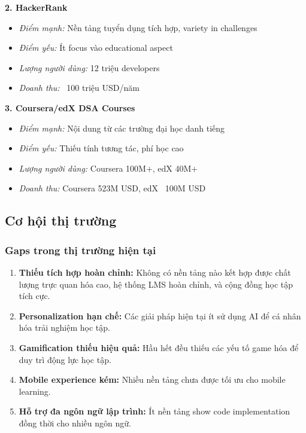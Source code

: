 \textbf{2. HackerRank}
\begin{itemize}
\item \textit{Điểm mạnh:} Nền tảng tuyển dụng tích hợp, variety in challenges
\item \textit{Điểm yếu:} Ít focus vào educational aspect
\item \textit{Lượng người dùng:} 12 triệu developers
\item \textit{Doanh thu:} ~100 triệu USD/năm
\end{itemize}

\textbf{3. Coursera/edX DSA Courses}
\begin{itemize}
\item \textit{Điểm mạnh:} Nội dung từ các trường đại học danh tiếng
\item \textit{Điểm yếu:} Thiếu tính tương tác, phí học cao
\item \textit{Lượng người dùng:} Coursera 100M+, edX 40M+
\item \textit{Doanh thu:} Coursera 523M USD, edX ~100M USD
\end{itemize}

\subsection{Cơ hội thị trường}
\label{subsec:market-opportunities}

\subsubsection{Gaps trong thị trường hiện tại}

\begin{enumerate}
\item \textbf{Thiếu tích hợp hoàn chỉnh:} Không có nền tảng nào kết hợp được chất lượng trực quan hóa cao, hệ thống LMS hoàn chỉnh, và cộng đồng học tập tích cực.

\item \textbf{Personalization hạn chế:} Các giải pháp hiện tại ít sử dụng AI để cá nhân hóa trải nghiệm học tập.

\item \textbf{Gamification thiếu hiệu quả:} Hầu hết đều thiếu các yếu tố game hóa để duy trì động lực học tập.

\item \textbf{Mobile experience kém:} Nhiều nền tảng chưa được tối ưu cho mobile learning.

\item \textbf{Hỗ trợ đa ngôn ngữ lập trình:} Ít nền tảng show code implementation đồng thời cho nhiều ngôn ngữ.
\end{enumerate}

